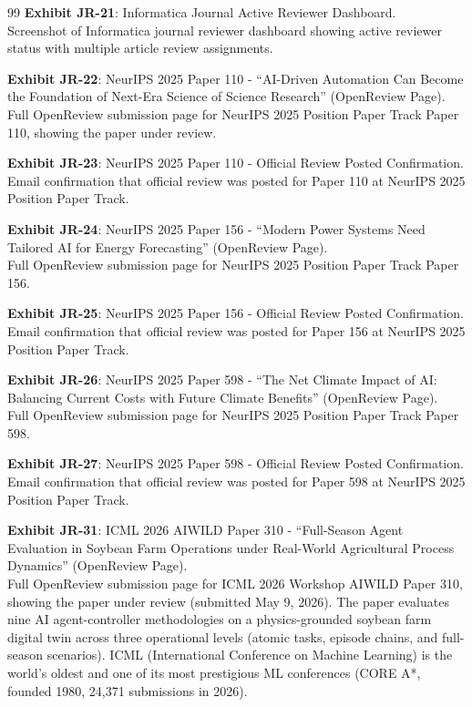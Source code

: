 \documentclass[11pt]{article}
\begin{document}
\begin{thebibliography}{99}
\textbf{Exhibit JR-21}: Informatica Journal Active Reviewer Dashboard.
\\Screenshot of Informatica journal reviewer dashboard showing \drs active reviewer status with multiple article review assignments.

\textbf{Exhibit JR-22}: NeurIPS 2025 Paper 110 - ``AI-Driven Automation Can Become the Foundation of Next-Era Science of Science Research'' (OpenReview Page).
\\Full OpenReview submission page for NeurIPS 2025 Position Paper Track Paper 110, showing the paper under review.

\textbf{Exhibit JR-23}: NeurIPS 2025 Paper 110 - Official Review Posted Confirmation.
\\Email confirmation that \drs official review was posted for Paper 110 at NeurIPS 2025 Position Paper Track.

\textbf{Exhibit JR-24}: NeurIPS 2025 Paper 156 - ``Modern Power Systems Need Tailored AI for Energy Forecasting'' (OpenReview Page).
\\Full OpenReview submission page for NeurIPS 2025 Position Paper Track Paper 156.

\textbf{Exhibit JR-25}: NeurIPS 2025 Paper 156 - Official Review Posted Confirmation.
\\Email confirmation that \drs official review was posted for Paper 156 at NeurIPS 2025 Position Paper Track.

\textbf{Exhibit JR-26}: NeurIPS 2025 Paper 598 - ``The Net Climate Impact of AI: Balancing Current Costs with Future Climate Benefits'' (OpenReview Page).
\\Full OpenReview submission page for NeurIPS 2025 Position Paper Track Paper 598.

\textbf{Exhibit JR-27}: NeurIPS 2025 Paper 598 - Official Review Posted Confirmation.
\\Email confirmation that \drs official review was posted for Paper 598 at NeurIPS 2025 Position Paper Track.

\textbf{Exhibit JR-31}: ICML 2026 AIWILD Paper 310 - ``Full-Season Agent Evaluation in Soybean Farm Operations under Real-World Agricultural Process Dynamics'' (OpenReview Page).
\\Full OpenReview submission page for ICML 2026 Workshop AIWILD Paper 310, showing the paper under review (submitted May 9, 2026). The paper evaluates nine AI agent-controller methodologies on a physics-grounded soybean farm digital twin across three operational levels (atomic tasks, episode chains, and full-season scenarios). ICML (International Conference on Machine Learning) is the world's oldest and one of its most prestigious ML conferences (CORE A*, founded 1980, 24,371 submissions in 2026).


\end{thebibliography}
\end{document}

